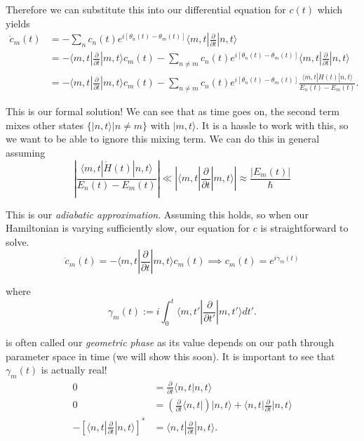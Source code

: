 \documentclass[12pt]{revtex4-2}
\begin{document}
Therefore we can substitute this into our differential equation for $c(t)$ which yields 
\begin{align}
    \dot{c}_m(t) &= -\sum_n c_n(t)e^{i[\theta_n(t)-\theta_m(t)]} \langle m,t| \frac{\partial}{\partial t} | n,t\rangle \\
    &= -\langle m,t| \frac{\partial}{\partial t} | m,t\rangle c_m(t) - \sum_{n\neq m} c_n(t)e^{i[\theta_n(t)-\theta_m(t)]} \langle m,t| \frac{\partial}{\partial t} | n,t\rangle \\
    &= -\langle m,t| \frac{\partial}{\partial t} | m,t\rangle c_m(t) - \sum_{n\neq m} c_n(t)e^{i[\theta_n(t)-\theta_m(t)]} \frac{\langle m,t|\dot{H}(t)|n,t\rangle}{E_n(t) - E_m(t)}.
\end{align}

This is our formal solution!  We can see that as time goes on, the second term mixes other states $\{|n,t\rangle | n\neq m\}$ with $|m,t\rangle$.  It is a hassle to work with this, so we want to be able to ignore this mixing term.  We can do this in general assuming 
\begin{equation}
    \boxed{ \left| \frac{\langle m,t|\dot{H}(t)|n,t\rangle}{E_n(t) - E_m(t)} \right| \ll \left| \langle m,t| \frac{\partial}{\partial t} | m,t\rangle \right| \approx \frac{|E_m(t)|}{\hbar} }
\end{equation}

This is our \emph{adiabatic approximation}.  Assuming this holds, so when our Hamiltonian is varying sufficiently slow, our equation for $c$ is straightforward to solve.
\begin{equation}
    \dot{c}_m(t) = -\langle m,t| \frac{\partial}{\partial t} | m,t\rangle c_m(t) \implies c_m(t) = e^{i\gamma_m(t)}
\end{equation}

where 
\begin{equation}
    \gamma_m(t) := i \int_0^t \langle m,t'| \frac{\partial}{\partial t'} | m,t'\rangle dt'.
\end{equation}

is often called our \emph{geometric phase} as its value depends on our path through parameter space in time (we will show this soon).  It is important to see that $\gamma_m(t)$ is actually real!
\begin{align}
    0 &= \frac{\partial}{\partial t}\langle n,t|n,t\rangle \\
    0 &= \left(\frac{\partial}{\partial t} \langle n,t| \right) | n,t\rangle + \langle n,t| \frac{\partial}{\partial t} | n,t\rangle \\
    -\left[ \langle n,t|\frac{\partial}{\partial t} | n,t\rangle \right]^* &= \langle n,t| \frac{\partial}{\partial t} | n,t\rangle.
\end{align}
\end{document}
